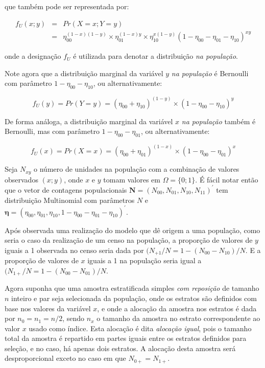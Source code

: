 \documentclass[]{book}
\theoremstyle{definition}
\theoremstyle{definition}
\theoremstyle{definition}
\theoremstyle{remark}
\begin{document}
que também pode ser representada por:

\begin{eqnarray}
 f_U (x ; y) &=& Pr( X = x ; Y = y )\\
             & =& \eta_{00}^{(1-x)(1-y)} \times \eta_{01}^{(1-x)y} \times \eta_{10}^{x(1-y)} (1 - \eta_{00} - \eta_{01} - \eta_{10})^{xy} \nonumber
\end{eqnarray}

onde a designação \(f_U\) é utilizada para denotar a distribuição
\emph{na população}.

Note agora que a distribuição marginal da variável \(y\)
\emph{na população} é Bernoulli com parâmetro
\(1 - \eta_{00} - \eta_{10}\), ou alternativamente:

\begin{equation}
 f_U (y) = Pr( Y = y ) = (\eta_{00} + \eta_{10})^{(1-y)} \times (1 - \eta_{00} - \eta_{10})^y
\end{equation}

De forma análoga, a distribuição marginal da variável \(x\)
\emph{na população} também é Bernoulli, mas com parâmetro
\(1 - \eta_{00} - \eta_{01}\), ou alternativamente:

\begin{equation}
 f_U (x) = Pr( X = x ) = (\eta_{00} + \eta_{01})^{(1-x)} \times (1 - \eta_{00} - \eta_{01})^x
\end{equation}

Seja \(N_{xy}\) o número de unidades na população com a combinação de
valores observados \((x;y)\), onde \(x\) e \(y\) tomam valores em
\(\Omega = \{ 0 ; 1 \}\). É fácil notar então que o vetor de contagens
populacionais
\(\mathbf{N} = ( N_{00}, N_{01}, N_{10}, N_{11} )^{\prime}\) tem
distribuição Multinomial com parâmetros \(N\) e
\(\mathbf{\eta} = (\eta_{00} , \eta_{01} , \eta_{10} , 1 - \eta_{00} - \eta_{01} - \eta_{10} )^{\prime}\).

Após observada uma realização do modelo que dê origem a uma população,
como seria o caso da realização de um censo na população, a proporção de
valores de \(y\) iguais a 1 observada no censo seria dada por
\((N_{+1} / N = 1 - (N_{00} - N_{10})/N\). E a proporção de valores de
\(x\) iguais a 1 na população seria igual a
\((N_{1+} / N = 1 - (N_{00} - N_{01})/N\).

Agora suponha que uma amostra estratificada simples \emph{com reposição}
de tamanho \(n\) inteiro e par seja selecionada da população, onde os
estratos são definidos com base nos valores da variável \(x\), e onde a
alocação da amostra nos estratos é dada por \(n_0 = n_1 = n/2\), sendo
\(n_x\) o tamanho da amostra no estrato correspondente ao valor \(x\)
usado como índice. Esta alocação é dita \emph{alocação igual}, pois o
tamanho total da amostra é repartido em partes iguais entre os estratos
definidos para seleção, e no caso, há apenas dois estratos. A alocação
desta amostra será desproporcional exceto no caso em que
\(N_{0+} = N_{1+}\).
\end{document}
